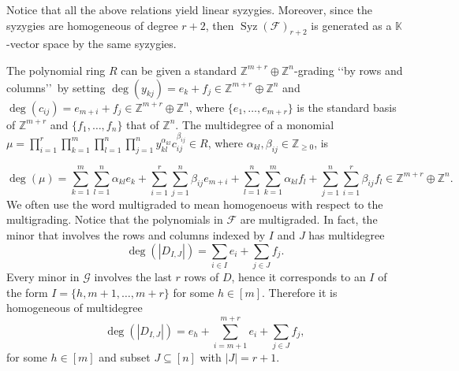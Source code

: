 \documentclass[utf8,latin1]{article}
\DeclareMathOperator{\Syz}{Syz}
\newcommand{\KK}{\mathbb{K}}
\newcommand{\ZZ}{\mathbb{Z}}
\newcommand{\abs}[1]{\ensuremath{\left\lvert #1 \right\rvert}}
\begin{document}
Notice that all the above relations yield linear syzygies. Moreover, since the syzygies are homogeneous of degree $r+2$, then $\Syz(\mathcal{F})_{r+2}$ is generated as a $\KK$-vector space by the same syzygies.

\medskip
	
The polynomial ring $R$ can be given a standard $\mathbb{Z}^{m+r} \oplus \mathbb{Z}^n$-grading \textquoteleft\textquoteleft by rows and columns\textquoteright\textquoteright~by setting $\deg(y_{kj})=e_k+f_j \in \mathbb{Z}^{m+r} \oplus \mathbb{Z}^n$ and $\deg(c_{ij})=e_{m+i}+f_j \in \mathbb{Z}^{m+r} \oplus \mathbb{Z}^n$, where $\{e_1,\ldots,e_{m+r}\}$ is the standard basis of $\ZZ^{m+r}$ and $\{f_1,\ldots,f_n\}$ that of $\ZZ^{n}$. The multidegree of a monomial $\mu=\prod_{i=1}^{r}\prod_{k=1}^m\prod_{l=1}^n\prod_{j=1}^n y_{kl}^{\alpha_{kl}} c_{ij}^{\beta_{ij}} \in R$, where $\alpha_{kl}, \beta_{ij} \in \mathbb{Z}_{\geq0}$, is 

$$\deg(\mu)=\sum_{k=1}^{m}\sum_{l=1}^{n} \alpha_{kl} e_{k} + \sum_{i=1}^{r}\sum_{j=1}^{n} \beta_{ij} e_{m+i} + \sum_{l=1}^{n}\sum_{k=1}^{m} \alpha_{kl} f_{l} + \sum_{j=1}^{n}\sum_{i=1}^{r} \beta_{ij} f_{l}\in \ZZ^{m+r} \oplus \ZZ^{n}.$$
We often use the word multigraded to mean homogenoeus with respect to the multigrading.
Notice that the polynomials in $\mathcal{F}$ are multigraded. In fact, the minor that involves the rows and columns indexed by $I$ and $J$ has multidegree
$$\deg(|D_{I,J}|)=\sum_{i \in I} e_i + \sum_{j \in J} f_{j}.$$
Every minor in $\mathcal{G}$ involves the last $r$ rows of $D$, hence it corresponds to an $I$ of the form $I=\{h,m+1,\ldots,m+r\}$ for some $h\in[m]$. Therefore it is homogeneous of multidegree $$\deg(|D_{I,J}|)=e_h + \sum_{i=m+1}^{m+r} e_i + \sum_{j \in J} f_{j},$$ for some $h \in [m]$ and subset $J \subseteq [ n ]$ with $\abs{J} = r+1$.

\medskip
 
\end{document}
